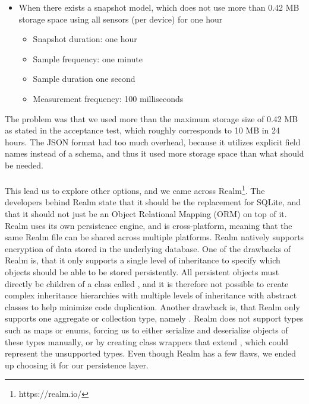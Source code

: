\begin{itemize}[noitemsep]
   \item When there exists a snapshot model, which does not use more than 0.42 MB storage space using all sensors (per device) for one hour
   \begin{itemize}[noitemsep,topsep=0pt,parsep=0pt,partopsep=0pt]
      \item Snapshot duration: one hour
      \item Sample frequency: one minute
      \item Sample duration one second
      \item Measurement frequency: 100 milliseconds
   \end{itemize}
\end{itemize}

The problem was that we used more than the maximum storage size of 0.42 MB as stated in the acceptance test, which roughly corresponds to 10 MB in 24 hours. The JSON format had too much overhead, because it utilizes explicit field names instead of a schema, and thus it used more storage space than what should be needed. %
\\\\
This lead us to explore other options, and we came across Realm\footnote{https://realm.io/}. The developers behind Realm state that it should be the replacement for SQLite, and that it should not just be an Object Relational Mapping (ORM) on top of it. Realm uses its own persistence engine, and is cross-platform, meaning that the same Realm file can be shared across multiple platforms. Realm natively supports encryption of data stored in the underlying database. One of the drawbacks of Realm is, that it only supports a single level of inheritance to specify which objects should be able to be stored persistently. All persistent objects must directly be children of a class called , and it is therefore not possible to create complex inheritance hierarchies with multiple levels of inheritance with abstract classes to help minimize code duplication. Another drawback is, that Realm only supports one aggregate or collection type, namely . Realm does not support types such as maps or enums, forcing us to either serialize and deserialize objects of these types manually, or by creating class wrappers that extend , which could represent the unsupported types. Even though Realm has a few flaws, we ended up choosing it for our persistence layer.

